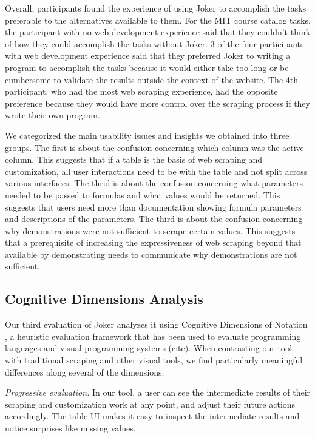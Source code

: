 \documentclass[sigconf,10pt]{acmart}
\begin{document}
Overall, participants found the experience of using Joker to accomplish
the tasks preferable to the alternatives available to them. For the MIT
course catalog tasks, the participant with no web development experience
said that they couldn't think of how they could accomplish the tasks
without Joker. 3 of the four participants with web development
experience said that they preferred Joker to writing a program to
accomplish the tasks because it would either take too long or be
cumbersome to validate the results outside the context of the website.
The 4th participant, who had the most web scraping experience, had the
opposite preference because they would have more control over the
scraping process if they wrote their own program.

We categorized the main usability issues and insights we obtained into
three groups. The first is about the confusion concerning which column
was the active column. This suggests that if a table is the basis of web
scraping and customization, all user interactions need to be with the
table and not split across various interfaces. The thrid is about the
confusion concerning what parameters needed to be passed to formulas and
what values would be returned. This suggests that users need more than
documentation showing formula parameters and descriptions of the
parameters. The third is about the confusion concerning why
demonstrations were not sufficient to scrape certain values. This
suggests that a prerequisite of increasing the expressiveness of web
scraping beyond that available by demonstrating needs to communicate why
demonstrations are not sufficient.

\hypertarget{cognitive-dimensions-analysis}{%
\subsection{Cognitive Dimensions
Analysis}\label{cognitive-dimensions-analysis}}

Our third evaluation of Joker analyzes it using Cognitive Dimensions of
Notation \citep{blackwell2001}, a heuristic evaluation framework that
has been used to evaluate programming languages and visual programming
systems (cite). When contrasting our tool with traditional scraping and
other visual tools, we find particularly meaningful differences along
several of the dimensions:

\emph{Progressive evaluation.} In our tool, a user can see the
intermediate results of their scraping and customization work at any
point, and adjust their future actions accordingly. The table UI makes
it easy to inspect the intermediate results and notice surprises like
missing values.
\end{document}
